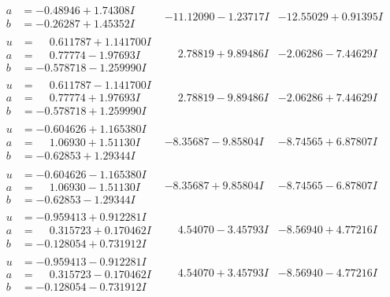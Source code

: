 \documentclass[1p]{elsarticle_modified}
\theoremstyle{definition}
\begin{document}
$$\begin{array}{c|c|c}
\begin{aligned}
a &= -0.48946 + 1.74308 I \\
b &= -0.26287 + 1.45352 I\end{aligned}
 & -11.12090 - 1.23717 I & -12.55029 + 0.91395 I \\ \hline\begin{aligned}
u &= \phantom{-}0.611787 + 1.141700 I \\
a &= \phantom{-}0.77774 - 1.97693 I \\
b &= -0.578718 - 1.259990 I\end{aligned}
 & \phantom{-}2.78819 + 9.89486 I & -2.06286 - 7.44629 I \\ \hline\begin{aligned}
u &= \phantom{-}0.611787 - 1.141700 I \\
a &= \phantom{-}0.77774 + 1.97693 I \\
b &= -0.578718 + 1.259990 I\end{aligned}
 & \phantom{-}2.78819 - 9.89486 I & -2.06286 + 7.44629 I \\ \hline\begin{aligned}
u &= -0.604626 + 1.165380 I \\
a &= \phantom{-}1.06930 + 1.51130 I \\
b &= -0.62853 + 1.29344 I\end{aligned}
 & -8.35687 - 9.85804 I & -8.74565 + 6.87807 I \\ \hline\begin{aligned}
u &= -0.604626 - 1.165380 I \\
a &= \phantom{-}1.06930 - 1.51130 I \\
b &= -0.62853 - 1.29344 I\end{aligned}
 & -8.35687 + 9.85804 I & -8.74565 - 6.87807 I \\ \hline\begin{aligned}
u &= -0.959413 + 0.912281 I \\
a &= \phantom{-}0.315723 + 0.170462 I \\
b &= -0.128054 + 0.731912 I\end{aligned}
 & \phantom{-}4.54070 - 3.45793 I & -8.56940 + 4.77216 I \\ \hline\begin{aligned}
u &= -0.959413 - 0.912281 I \\
a &= \phantom{-}0.315723 - 0.170462 I \\
b &= -0.128054 - 0.731912 I\end{aligned}
 & \phantom{-}4.54070 + 3.45793 I & -8.56940 - 4.77216 I \\ \hline\begin{aligned}

\end{aligned}
\end{array}$$
\end{document}
